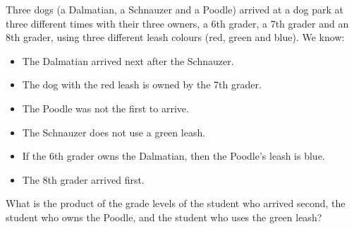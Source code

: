 Three dogs (a Dalmatian, a Schnauzer and a Poodle) arrived at a dog park at three different times with their three owners, a 6th grader, a 7th grader and an 8th grader, using three different leash colours (red, green and blue). We know:
\begin{itemize}
\item The Dalmatian arrived next after the Schnauzer.
\item The dog with the red leash is owned by the 7th grader.
\item The Poodle was not the first to arrive.
\item The Schnauzer does not use a green leash.
\item If the 6th grader owns the Dalmatian, then the Poodle's leash is blue.
\item The 8th grader arrived first.
\end{itemize}
What is the product of the grade levels of the student who arrived second, the student who owns the Poodle, and the student who uses the green leash?
